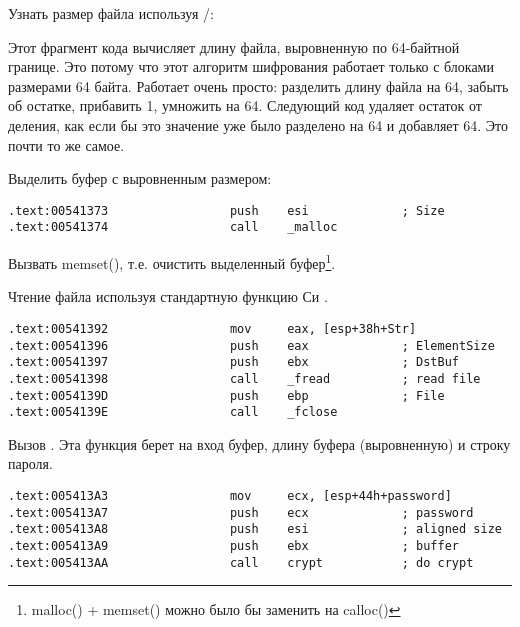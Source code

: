 Узнать размер файла используя /:



Этот фрагмент кода вычисляет длину файла, выровненную по 64-байтной границе.
Это потому что этот алгоритм шифрования работает только с блоками размерами 64 байта.
Работает очень просто: разделить длину файла на 64, забыть об остатке, прибавить 1,
умножить на 64.
Следующий код удаляет остаток от деления, как если бы это значение уже было разделено 
на 64 и добавляет 64. Это почти то же самое.



Выделить буфер с выровненным размером:

\begin{lstlisting}[style=customasm]
.text:00541373                 push    esi             ; Size
.text:00541374                 call    _malloc
\end{lstlisting}

Вызвать memset(), т.е. очистить выделенный буфер\footnote{malloc() + memset() можно было бы 
заменить на calloc()}.



Чтение файла используя стандартную функцию Си .

\begin{lstlisting}[style=customasm]
.text:00541392                 mov     eax, [esp+38h+Str]
.text:00541396                 push    eax             ; ElementSize
.text:00541397                 push    ebx             ; DstBuf
.text:00541398                 call    _fread          ; read file
.text:0054139D                 push    ebp             ; File
.text:0054139E                 call    _fclose
\end{lstlisting}

Вызов . Эта функция берет на вход буфер, длину буфера (выровненную) и строку пароля.

\begin{lstlisting}[style=customasm]
.text:005413A3                 mov     ecx, [esp+44h+password]
.text:005413A7                 push    ecx             ; password
.text:005413A8                 push    esi             ; aligned size
.text:005413A9                 push    ebx             ; buffer
.text:005413AA                 call    crypt           ; do crypt
\end{lstlisting}

